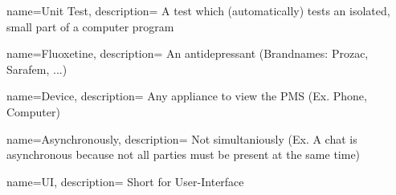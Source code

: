 {  
    name={Unit Test},
    description={
        A test which (automatically) tests an isolated, small part of a computer program
    }
}

{  
    name={Fluoxetine},
    description={
        An antidepressant (Brandnames: Prozac, Sarafem, ...)
    }
}

{  
    name={Device},
    description={
      Any appliance to view the PMS (Ex. Phone, Computer)
    }
}

{  
    name={Asynchronously},
    description={
      Not simultaniously (Ex. A chat is asynchronous because not all parties must be present at the same time)
    }
}

{  
    name={UI},
    description={
      Short for User-Interface
    }
}
